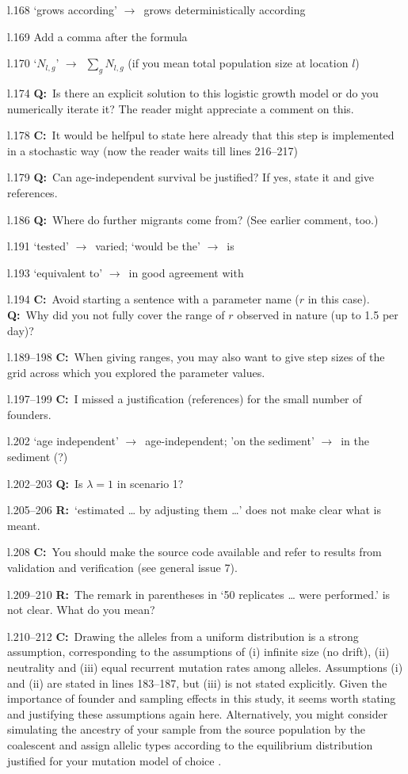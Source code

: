 \documentclass[11pt]{article}
\newenvironment{my_description}
{\begin{description}
  \setlength{\itemsep}{2pt}
  \setlength{\parskip}{0pt}
  \setlength{\parsep}{0pt}}
{\end{description}}
\newcommand{\ra}{$\rightarrow$\ }
\newcommand{\C}{\textbf{C:}\ }
\newcommand{\Q}{\textbf{Q:}\ }
\newcommand{\R}{\textbf{R:}\ }
\begin{document}
\begin{my_description}
	\item[l.168] `grows according' \ra grows deterministically according
	\item[l.169] Add a comma after the formula
	\item[l.170] `$N_{l,g}$' \ra $\sum_{g}N_{l,g}$ (if you mean total population size at location $l$)
	\item[l.174] \Q Is there an explicit solution to this logistic growth model or do you numerically iterate it? The reader might appreciate a comment on this.
	\item[l.178] \C It would be helfpul to state here already that this step is implemented in a stochastic way (now the reader waits till lines 216--217)
	\item[l.179] \Q Can age-independent survival be justified? If yes, state it and give references.
	\item[l.186] \Q Where do further migrants come from? (See earlier comment, too.)
	\item[l.191] `tested' \ra varied; `would be the' \ra is
	\item[l.193] `equivalent to' \ra in good agreement with
	\item[l.194] \C Avoid starting a sentence with a parameter name ($r$ in this case). \Q Why did you not fully cover the range of $r$ observed in nature (up to 1.5 per day)?
	\item[l.189--198] \C When giving ranges, you may also want to give step sizes of the grid across which you explored the parameter values.
	\item[l.197--199] \C I missed a justification (references) for the small number of founders.	
	\item[l.202] `age independent' \ra age-independent; 'on the sediment' \ra in the sediment (?)
	\item[l.202--203] \Q Is $\lambda = 1$ in scenario 1?
	\item[l.205--206] \R `estimated \ldots{} by adjusting them \ldots{}' does not make clear what is meant.
	\item[l.208] \C You should make the source code available and refer to results from validation and verification (see general issue 7).
	\item[l.209--210] \R The remark in parentheses in `50 replicates \ldots{} were performed.' is not clear. What do you mean?
	\item[l.210--212] \C Drawing the alleles from a uniform distribution is a strong assumption, corresponding to the assumptions of (i) infinite size (no drift), (ii) neutrality and (iii) equal recurrent mutation rates among alleles. Assumptions (i) and (ii) are stated in lines 183--187, but (iii) is not stated explicitly. Given the importance of founder and sampling effects in this study, it seems worth stating and justifying these assumptions again here. Alternatively, you might consider simulating the ancestry of your sample from the source population by the coalescent and assign allelic types according to the equilibrium distribution justified for your mutation model of choice \cite[e.g.][]{Wakeley:2009kx}.

\end{my_description}
\end{document}
